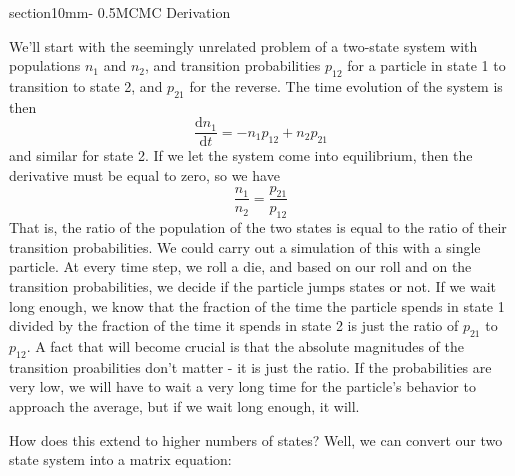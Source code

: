 \documentclass[letterpaper,11pt,preprint]{aastex}
\makeatletter
\renewcommand{\section}{\@startsection%
{section}{1}{0mm}{-\baselineskip}%
{0.5\baselineskip}{\normalfont\Large\bfseries}}%
\makeatother
\begin{document}
\section{MCMC Derivation}

We'll start with
the seemingly unrelated problem of a two-state system with populations
$n_1$ and $n_2$, and transition probabilities $p_{12}$ for a particle
in state 1 to transition to state 2, and $p_{21}$ for the reverse.
The time evolution of the system is then 
$$\frac{\mathrm{d}n_1}{\mathrm{d}t}=-n_1p_{12}+n_2p_{21}$$
and similar for state 2.  If we let the system come into equilibrium,
then the derivative must be equal to zero, so we have
\begin{equation}
\label{eq:mc2state}
\frac{n_1}{n_2}=\frac{p_{21}}{p_{12}}
\end{equation}
That is, the ratio of the population of the two states is equal to the
ratio of their transition probabilities.  We could carry out a
simulation of this with a single particle.  At every time step, we
roll a die, and based on our roll and on the transition probabilities,
we decide if the particle jumps states or not.  If we wait long
enough, we know that the fraction of the time the particle spends in
state 1 divided by the fraction of the time it spends in state 2 is
just the ratio of $p_{21}$ to $p_{12}$.   A fact that will become
crucial is that the absolute magnitudes of the transition proabilities
don't matter - it is just the ratio.  If the probabilities are very
low, we will have to wait a very long time for the particle's behavior
to approach the average, but if we wait long enough, it will.

How does this extend to higher numbers of states?  Well, we can
convert our two state system into a matrix equation:
\end{document}
